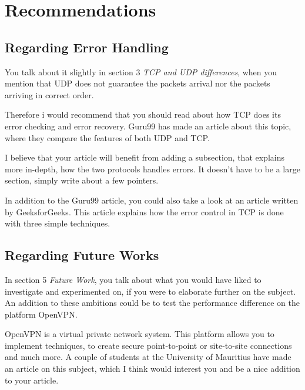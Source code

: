 \section{Recommendations}

\subsection{Regarding Error Handling}

You talk about it slightly in section 3 \emph{TCP and UDP differences}, when you mention that UDP does not guarantee the packets arrival nor the packets arriving in correct order.

Therefore i would recommend that you should read about how TCP does its error checking and error recovery. Guru99 has made an article\cite{guru_tcp_vs_udp} about this topic, where they compare the features of both UDP and TCP. 

I believe that your article will benefit from adding a subsection, that explains more in-depth, how the two protocols handles errors. It doesn't have to be a large section, simply write about a few pointers.

In addition to the Guru99 article, you could also take a look at an article written by GeeksforGeeks\cite{gfg_tcp_vs_udp}. This article explains how the error control in TCP is done with three simple techniques.

\subsection{Regarding Future Works}

In section 5 \emph{Future Work}, you talk about what you would have liked to investigate and experimented on, if you were to elaborate further on the subject. An addition to these ambitions could be to test the performance difference on the platform OpenVPN. 

OpenVPN is a virtual private network system. This platform allows you to implement techniques, to create secure point-to-point or site-to-site connections and much more. A couple of students at the University of Mauritius have made an article\cite{research_gate_tcp_vs_udp} on this subject, which I think would interest you and be a nice addition to your article.